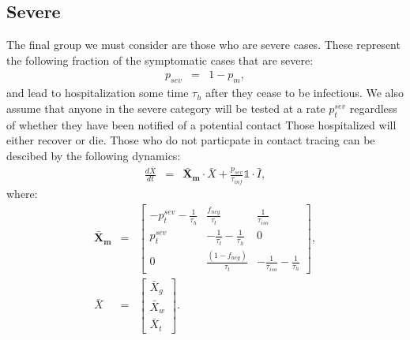 \documentclass[notitlepage, superscriptaddress]{revtex4-2}
\begin{document}
\subsection{Severe}
The final group we must consider are those who are severe cases. These represent the following fraction of the symptomatic cases that are severe:
\begin{eqnarray}
p_{sev} &=& 1 - p_{m},
\end{eqnarray}
and lead to hospitalization some time $\tau_{h}$ after they cease to be infectious. We also assume that anyone in the severe category will be tested at a rate $p^{sev}_{t}$ regardless of whether they have been notified of a potential contact Those hospitalized will either recover or die. Those who do not particpate in contact tracing can be descibed by the following dynamics:
\begin{eqnarray}
\frac{d\bar{X}}{dt} &=& \boldsymbol{\bar{X}_{m}} \cdot \bar{X} + \frac{p_{sev}}{\tau_{inf}} \mathbb{1} \cdot  \bar{I}, 
\end{eqnarray}
where:
%
\begin{eqnarray}
\boldsymbol{\bar{X}_{m}} &=&
\begin{bmatrix}
- p^{sev}_{t} -\frac{1}{\tau_{h}}  &  \frac{f_{neg}}{\tau_{t}}            & \frac{1}{\tau_{iso}} \\ 
 p^{sev}_{t}              & -\frac{1}{\tau_{t}} -\frac{1}{\tau_{h}}       & 0  \\ 
 0                  & \frac{(1- f_{neg})}{\tau_{t}}                        & -\frac{1}{\tau_{iso}} -\frac{1}{\tau_{h}}
\end{bmatrix}, \\ 
%
\bar{X} &=& 
\begin{bmatrix}
\bar{X}_{g} \\ \bar{X}_{w}\\ \bar{X}_{t}
\end{bmatrix}. \\ 
%
\end{eqnarray}
\end{document}
